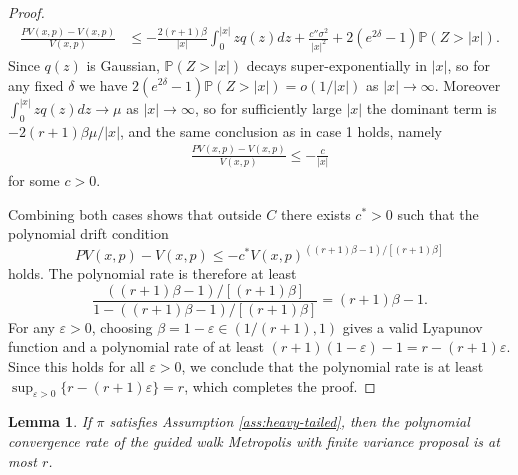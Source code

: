 \documentclass{article}
\theoremstyle{definition}
\theoremstyle{plain}
\newtheorem{lemma}[definition]{Lemma}
\begin{document}
\begin{proof}
\begin{align}
    \frac{PV(x,p) - V(x,p)}{V(x,p)} &\le -\frac{2(r+1)\beta}{|x|}\int_0^{|x|}zq(z)dz + \frac{c''\sigma^2}{|x|^2} + 2(e^{2\delta}-1)\mathbb{P}(Z>|x|).
\end{align}
Since $q(z)$ is Gaussian, $\mathbb{P}(Z > |x|)$ decays super-exponentially in $|x|$, so for any fixed $\delta$ we have $2(e^{2\delta}-1)\mathbb{P}(Z>|x|) = o(1/|x|)$ as $|x| \to \infty$. Moreover $\int_0^{|x|}zq(z)dz \to \mu$ as $|x|\to\infty$, so for sufficiently large $|x|$ the dominant term is $-2(r+1)\beta\mu/|x|$, and the same conclusion as in case 1 holds, namely
\begin{align}
    \frac{PV(x,p) - V(x,p)}{V(x,p)} \leq -\frac{c}{|x|}
\end{align}
for some $c > 0$.

Combining both cases shows that outside $C$ there exists $c^*>0$ such that the polynomial drift condition
\begin{equation}
    PV(x,p) - V(x,p) \le -c^*V(x,p)^{((r+1)\beta-1)/[(r+1)\beta]}
\end{equation}
holds. The polynomial rate is therefore at least
\begin{equation}
    \frac{((r+1)\beta-1)/[(r+1)\beta]}{1-((r+1)\beta-1)/[(r+1)\beta]} = (r+1)\beta -1.
\end{equation}
For any $\varepsilon > 0$, choosing $\beta = 1-\varepsilon \in (1/(r+1), 1)$ gives a valid Lyapunov function and a polynomial rate of at least $(r+1)(1-\varepsilon) - 1 = r - (r+1)\varepsilon$. Since this holds for all $\varepsilon > 0$, we conclude that the polynomial rate is at least $\sup_{\varepsilon > 0}\{r - (r+1)\varepsilon\} = r$, which completes the proof.
\end{proof}



\begin{lemma}
\label{lem:upperbound_polynomialtails}
    If $\pi$ satisfies Assumption \ref{ass:heavy-tailed}, then the polynomial convergence rate of the guided walk Metropolis with finite variance proposal is at most $r$.
\end{lemma}
\end{document}
